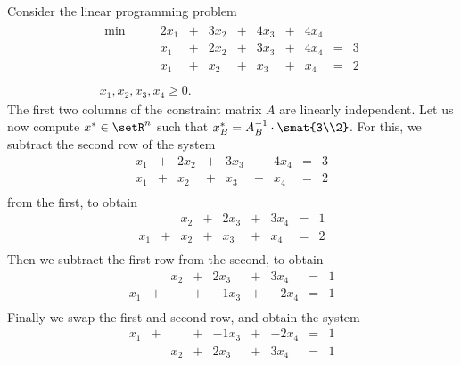  Consider the linear
programming problem 
\begin{equation}
  \label{eq:40}
  \begin{array}{r}
  \begin{matrix}               
    \min \quad \quad  & 2 x_1 & + & 3 x_2 & +&  4 x_3 & +&  4 x_4  & & \\
                      & x_1   & + & 2 x_2 & + & 3 x_3 & + & 4 x_4 & =&  3 \\
                      & x_1   & + & x_2  & + & x_3 & + & x_4 & = & 2                      \\                          
  \end{matrix} \\
  x_1,x_2,x_3,x_4 \geq0. 
\end{array}
\end{equation}
The first two columns of the constraint matrix $A$ are linearly
independent. Let us now compute $x^* \in \setR^n$ such that $x^*_B =
A_B^{-1} \cdot \smat{3\\2}$. For this, we subtract the second row of the 
system 
\begin{displaymath}
  \begin{matrix}    
    x_1   & + & 2 x_2 & + & 3 x_3 & + & 4 x_4 & =&  3 \\
    x_1   & + & x_2  & + & x_3 & + & x_4 & = & 2
    \\                          
  \end{matrix}
\end{displaymath}
from the first, to obtain 
\begin{displaymath}
  \begin{matrix}    
         &   &  x_2 & + & 2 x_3 & + & 3 x_4 & =&  1 \\
    x_1   & + & x_2  & + & x_3 & + & x_4 & = & 2
    \\                          
  \end{matrix}
\end{displaymath}
Then we subtract the first row from the second, to obtain 
\begin{displaymath}
  \begin{matrix}    
         &  &  x_2 & + & 2 x_3 & + & 3 x_4 & =&  1 \\
    x_1   & + &     & + & -1 x_3 & + & -2x_4 & = & 1
    \\                          
  \end{matrix}
\end{displaymath}
Finally we swap the first and second row, and obtain the system 
\begin{displaymath}
  \begin{matrix}       
    x_1   & + &     & + & -1 x_3 & + & -2x_4 & = & 1    
    \\                          
    &   &  x_2 & + & 2 x_3 & + & 3 x_4 & =&  1 
  \end{matrix}
\end{displaymath}

